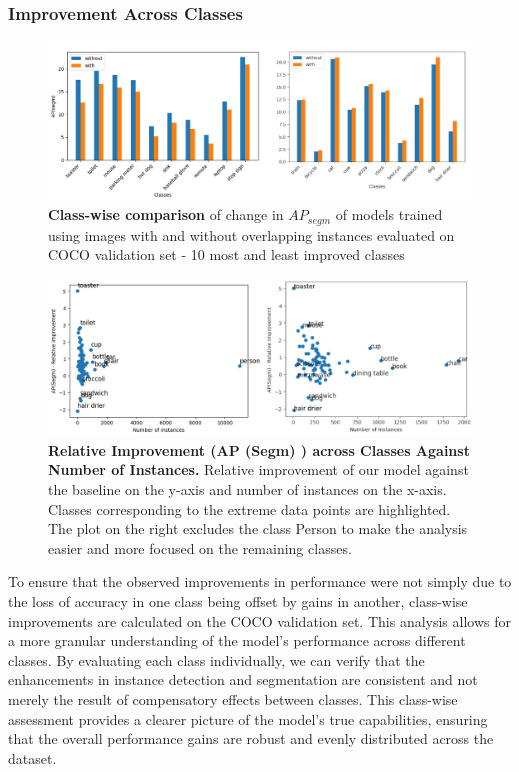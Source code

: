 \subsubsection{Improvement Across Classes}
\begin{figure}
	\centering
	\includegraphics[width=1.05\textwidth]{Images/main/overlap_classes_new.png}
	\caption[\textbf{Training without Overlapping Instances - Class-wise Comparison}]{\textbf{Class-wise comparison} of change in \(AP_{segm}\) of models trained using images with and without overlapping instances evaluated on COCO validation set - 10 most and least improved classes}
	\label{fig:overlap_classes}
\end{figure}

\begin{figure}
	\centering
	\includegraphics[width=1\textwidth]{Images/main/relative_improvement_combined.png}
	\caption[\textbf{Relative Improvement Against Number of Instances}]{\textbf{Relative Improvement (AP (Segm) ) across Classes Against Number of Instances.} Relative improvement of our model against the baseline on the y-axis and number of instances on the x-axis. Classes corresponding to the extreme data points are highlighted. The plot on the right excludes the class Person to make the analysis easier and more focused on the remaining classes.}
	\label{fig:relative_improvement}
\end{figure}

To ensure that the observed improvements in performance were not simply due to the loss of accuracy in one class being offset by gains in another, class-wise improvements are calculated on the COCO validation set. This analysis allows for a more granular understanding of the model’s performance across different classes. By evaluating each class individually, we can verify that the enhancements in instance detection and segmentation are consistent and not merely the result of compensatory effects between classes. This class-wise assessment provides a clearer picture of the model's true capabilities, ensuring that the overall performance gains are robust and evenly distributed across the dataset.


